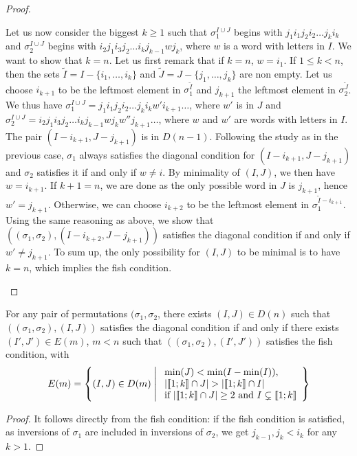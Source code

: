 \begin{proof}
\begin{itemize}
Let us now consider the biggest $k\geq 1$ such that $\sigma^{I \cup J}_1$ begins with $j_1 i_1 j_2 i_2 \ldots j_k i_k$ and $\sigma^{I \cup J}_2$ begins with $i_2 j_1 i_3 j_2\ldots i_k j_{k-1} w j_k$, where $w$ is a word with letters in $I$. We want to show that $k=n$. Let us first remark that if $k=n$, $w=i_1$. If $1\leq k<n$, then the sets $\tilde{I}=I-\{i_1, \ldots, i_k\}$ and $\tilde{J}=J-\{j_1, \ldots, j_k\}$ are non empty. Let us choose $i_{k+1}$ to be the leftmost element in $\sigma^{\tilde{I}}_1$ and $j_{k+1}$ the leftmost element in $\sigma^{\tilde{J}}_2$. We thus have $\sigma^{I \cup J}_1=j_1 i_1 j_2 i_2 \ldots j_k i_k w' i_{k+1}\ldots$, where $w'$ is in $J$ and $\sigma^{I \cup J}_2= i_2 j_1 i_3 j_2\ldots i_k j_{k-1} w j_k w'' j_{k+1}\ldots $, where $w$ and $w'$ are words with letters in $I$. The pair $(I-i_{k+1},J-j_{k+1})$ is in $D(n-1)$. Following the study as in the previous case, $\sigma_1$ always satisfies the diagonal condition for $(I-i_{k+1},J-j_{k+1})$ and $\sigma_2$ satisfies it if and only if $w \neq i$. By minimality of $(I,J)$, we then have $w=i_{k+1}$. If $k+1=n$, we are done as the only possible word in $J$ is $j_{k+1}$, hence $w'=j_{k+1}$. Otherwise, we can choose $i_{k+2}$ to be the leftmost element in $\sigma_1^{\tilde{I}-i_{k+1}}$. Using the same reasoning as above, we show that $((\sigma_1, \sigma_2),(I-i_{k+2},J-j_{k+1}))$ satisfies the diagonal condition if and only if $w'\neq j_{k+1}$. To sum up, the only possibility for $(I,J)$ to be minimal is to have $k=n$, which implies the fish condition.
\end{itemize}
\end{proof}

\begin{corollary} For any pair of permutations $(\sigma_1, \sigma_2$, there exists $(I,J) \in D(n)$ such that $((\sigma_1, \sigma_2),(I,J))$ satisfies the diagonal condition if and only if there exists $(I',J') \in E(m)$, $m<n$ such that $((\sigma_1, \sigma_2),(I',J'))$ satisfies the fish condition, with 
\[
E(m)=\left\{ (I,J)\in D(m) \;\middle|\; \begin{array}{l} \min(J)<\min(I-\min(I)), \\ |\llbracket 1; k \rrbracket \cap J| > |\llbracket 1; k \rrbracket \cap I| \\ \text{if } |\llbracket 1; k \rrbracket \cap J| \geq 2 \text{ and } I \subsetneq \llbracket 1; k \rrbracket \end{array} \right\}
\]
\end{corollary}

\begin{proof}
It follows directly from the fish condition: if the fish condition is satisfied, as inversions of $\sigma_1$ are included in inversions of $\sigma_2$, we get $j_{k-1},j_k<i_k$ for any $k>1$.
\end{proof}

